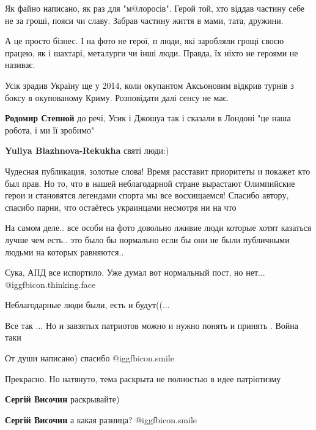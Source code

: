 \begin{itemize}
Як файно написано, як раз для "м@лоросів". Герой той, хто віддав частину себе
не за гроші, пояси чи славу. Забрав частину життя в мами, тата, дружини.

А це просто бізнес. І на фото не герої, п люди, які заробляли грощі своєю
працею, як і шахтарі, металурги чи інші люди. Правда, їх ніхто не героями не
називає.

Усік зрадив Україну ще у 2014, коли окупантом Аксьоновим відкрив турнів з боксу
в окупованому Криму. Розповідати далі сенсу не має.

\begin{itemize} %
\textbf{Родомир Степной} до речі, Усик і Джошуа так і сказали в Лондоні "це наша робота, і ми її зробимо"

\textbf{Yuliya Blazhnova-Rekukha} святі люди:)
\end{itemize} %


Чудесная публикация, золотые слова! Время расставит приоритеты и покажет кто
был прав. Но то, что в нашей неблагодарной стране вырастают Олимпийские герои и
становятся легендами спорта мы все восхищаемся! Спасибо автору, спасибо парни,
что остаётесь украинцами несмотря ни на что



На самом деле.. все особи на фото довольно лживие люди которые хотят казаться
лучше чем есть.. это было бы нормально если бы они не были публичными людьми на
которых равняются..


Сука, АПД все испортило. Уже думал вот нормальный пост, но нет... @igg{fbicon.thinking.face} 

Неблагодарные люди были, есть и будут((...

Все так ... Но и завзятых патриотов можно и нужно понять и принять . Война таки

От души написано) спасибо  @igg{fbicon.smile} 

Прекрасно. Но натянуто, тема раскрыта не полностью в идее патріотизму

\begin{itemize} %
\textbf{Сергій Височин} раскрывайте)

\textbf{Сергій Височин} а какая разница?  @igg{fbicon.smile} 
\end{itemize} %


\end{itemize}
